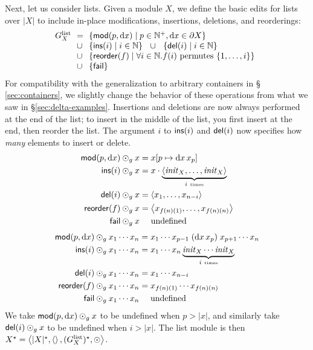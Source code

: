 Next, let us consider lists.  
Given a module $X$, we define the basic edits for lists over $|X|$ to
include in-place modifications, insertions, deletions, and reorderings:
\[
\begin{array}{@{}l@{\ \ }l@{\ \ }l}
    G^{\mathrm{list}}_X &=& \{\mlmod p\dx \mid p \in \NAT^+,\dx \in \partial X\} \\
    &\cup& \{\mlins i \mid i \in \NAT\} \ \ \cup\ \  \{\mldel i \mid i \in \NAT\} \\
    &\cup& \{\mlreorder f \mid \forall i \in \NAT. f(i)\mbox{ permutes }\{1,\ldots,i\}\} \\
    &\cup& \{\fail\}
\end{array}
\]
For compatibility with the generalization to arbitrary containers in \S
\ref{sec:containers}, we slightly change the behavior of these operations 
from what we saw in \S \ref{sec:delta-examples}.
Insertions and deletions are now always performed 
at the end of the list; to insert in the middle of the list, you first
insert at the end, then reorder the list.  The argument $i$ to
$\mathsf{ins}(i)$ and $\mathsf{del}(i)$ now specifies how {\em many} elements to insert or
delete. 
\iflater{}\fi
\ifdissertation
\begin{align*}
    \mlmod p\dx \odot\gen x
    &= x[p\mapsto\dx\,x_p] \\
    \mlins i \odot\gen x
    &= x \cdot \underbrace{\blist\init_{X}, \ldots, \init_{X}\elist}_{i\ \mbox{\tiny times}}\\
    \mldel i \odot\gen x
    &= \blist x_1, \ldots, x_{n-i} \elist \\
    \mlreorder f \odot\gen x
    &= \blist x_{f(n)(1)}, \ldots, x_{f(n)(n)} \elist \\
    \fail \odot\gen x
    &{\phantom{{}={}}} \mbox{undefined}
\end{align*}
\else
\begin{align*}
    \mlmod p\dx \odot\gen x_1 \cdots x_n
    &= x_1 \cdots x_{p-1}\; (\dx\,x_p) \; x_{p+1} \cdots x_n \\
    \mlins i \odot\gen x_1 \cdots x_n
    &= x_1 \cdots x_n \underbrace{\init_{X} \cdots \init_{X}}_{i\ \mbox{\tiny times}}\\
    \mldel i \odot\gen x_1 \cdots x_n
    &= x_1 \cdots x_{n-i} \\
    \mlreorder f \odot\gen x_1 \cdots x_n
    &= x_{f(n)(1)} \cdots x_{f(n)(n)} \\
    \fail \odot\gen x_1 \cdots x_n
    &{\phantom{{}={}}} \mbox{undefined}
\end{align*}
\fi%
We take $\mathsf{mod}(p,\textrm{d} x) \odot_g x$ to be undefined when $p > |x|$,
and similarly take $\mathsf{del}(i) \odot_g x$ to be undefined when $i >
|x|$. The list module is then $X\LIST =
\left<|X|\LIST,\NIL,(G^{\mathrm{list}}_X)\LIST,\odot\right>$.

